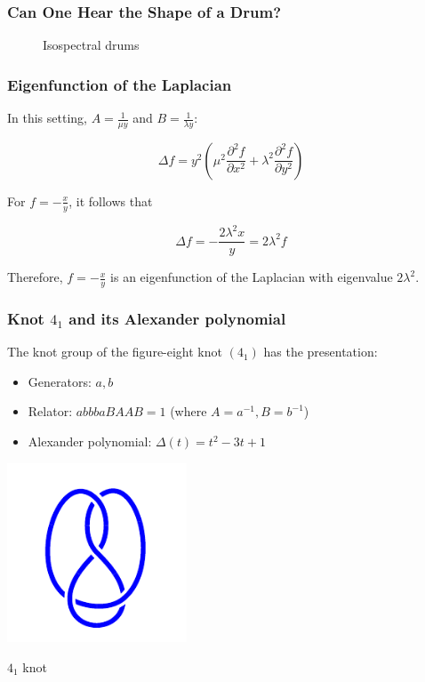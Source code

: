 \documentclass[aspectratio=169]{beamer}
\begin{document}
\begin{frame}
    \frametitle{Can One Hear the Shape of a Drum?}
    \begin{figure}[ht]\centering
    \caption{Isospectral drums}
    \end{figure}
\end{frame}

\begin{frame}
    \frametitle{Eigenfunction of the Laplacian}
    In this setting, \(A = \frac{1}{\mu y}\) and \(B = \frac{1}{\lambda y}\):

    \[
        \Delta f = y^2 \left(\mu^2 \frac{\partial^2 f}{\partial x^2} + \lambda^2 \frac{\partial^2 f}{\partial y^2}\right)
    \]

    For \(f = -\frac{x}{y}\), it follows that

    \[
        \Delta f = - \frac{2 \lambda^2 x}{y} = 2 \lambda^2 f
    \]

    Therefore, \(f = -\frac{x}{y}\) is an eigenfunction of the Laplacian with eigenvalue \(2\lambda^2\).
\end{frame}

\begin{frame}
    \frametitle{Knot $4_1$ and its Alexander polynomial}
    The knot group of the figure-eight knot $(4_1)$ has the presentation:
    \begin{itemize}
        \item Generators: $a, b$
        \item Relator: $abbbaBAAB = 1$ (where $A=a^{-1}, B=b^{-1}$)
        \item Alexander polynomial: $\Delta(t) = t^2 - 3t + 1$
    \end{itemize}
    \begin{center}
        \includegraphics[width=0.4\textwidth]{../images/knot_4_1}

        {\small $4_1$ knot}
    \end{center}
\end{frame}
\end{document}
